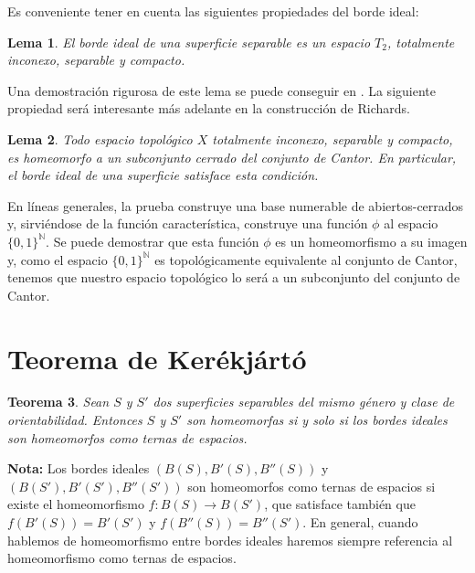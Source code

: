 \documentclass[a4paper,11pt,spanish, twoside, leqno]{tfg-uam}
\newtheorem{teor}{Teorema}[chapter]
\newtheorem{lema}[teor]{Lema}
\theoremstyle{definition}
\begin{document}
Es conveniente tener en cuenta las siguientes propiedades del borde ideal:

\begin{lema}
\label{lema:bordeidealcantor}
El borde ideal de una superficie separable es un espacio $T_2$, totalmente inconexo, separable y compacto. 
\end{lema}
Una demostración rigurosa de este lema se puede conseguir en \cite{Ahlfors}. La siguiente propiedad será interesante más adelante en la construcción de Richards.

\begin{lema}
\label{lema:bordeidealcantor2}
Todo espacio topológico $X$ totalmente inconexo, separable y compacto, es homeomorfo a un subconjunto cerrado del conjunto de Cantor. En particular, el borde ideal de una superficie satisface esta condición.
\end{lema}

En líneas generales, la prueba construye una base numerable de abiertos-cerrados y, sirviéndose de la función característica, construye una función $\phi$ al espacio $\{0,1\}^\mathbb{N}$. Se puede demostrar que esta función $\phi$ es un homeomorfismo a su imagen y, como el espacio $\{0,1\}^\mathbb{N}$ es topológicamente equivalente al conjunto de Cantor, tenemos que nuestro espacio topológico lo será a un subconjunto del conjunto de Cantor.

\section{Teorema de Kerékjártó}
\begin{teor}
\label{teor:kerekjarto}
Sean $S$ y $S'$ dos superficies separables del mismo género y clase de orientabilidad. Entonces $S$ y $S'$ son homeomorfas si y solo si los bordes ideales son homeomorfos como ternas de espacios.
\end{teor}
\noindent \textbf{Nota:} Los bordes ideales $(B(S), B'(S), B''(S))$ y $(B(S'), B'(S'), B''(S'))$ son homeomorfos como ternas de espacios si existe el homeomorfismo $f: B(S) \rightarrow B(S')$, que satisface también que $f(B'(S)) = B'(S') $ y $f(B''(S)) = B''(S')$. En general, cuando hablemos de homeomorfismo entre bordes ideales haremos siempre referencia al homeomorfismo como ternas de espacios.
\end{document}
